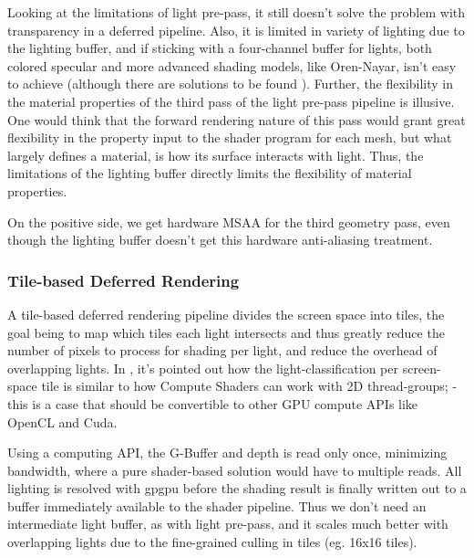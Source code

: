 Looking at the limitations of light pre-pass, it still doesn't solve the problem with transparency in a deferred pipeline. Also, it is limited in variety of lighting due to the lighting buffer, and if sticking with a four-channel buffer for lights, both colored specular and more advanced shading models, like Oren-Nayar, isn't easy to achieve (although there are solutions to be found \cite{blindrenderer2011}). Further, the flexibility in the material properties of the third pass of the light pre-pass pipeline is illusive. One would think that the forward rendering nature of this pass would grant great flexibility in the property input to the shader program for each mesh, but what largely defines a material, is how its surface interacts with light. Thus, the limitations of the lighting buffer directly limits the flexibility of material properties.

On the positive side, we get hardware MSAA for the third geometry pass, even though the lighting buffer doesn't get this hardware anti-aliasing treatment.

\subsubsection{Tile-based Deferred Rendering}

A tile-based deferred rendering pipeline divides the screen space into tiles, the goal being to map which tiles each light intersects and thus greatly reduce the number of pixels to process for shading per light, and reduce the overhead of overlapping lights. In \cite{andersson2009}, it's pointed out how the light-classification per screen-space tile is similar to how Compute Shaders can work with 2D thread-groups; - this is a case that should be convertible to other GPU compute APIs like OpenCL and Cuda. 

Using a computing API, the G-Buffer and depth is read only once, minimizing bandwidth, where a pure shader-based solution would have to multiple reads. All lighting is resolved with gpgpu before the shading result is finally written out to a buffer immediately available to the shader pipeline. Thus we don't need an intermediate light buffer, as with light pre-pass, and it scales much better with overlapping lights due to the fine-grained culling in tiles (eg. 16x16 tiles).